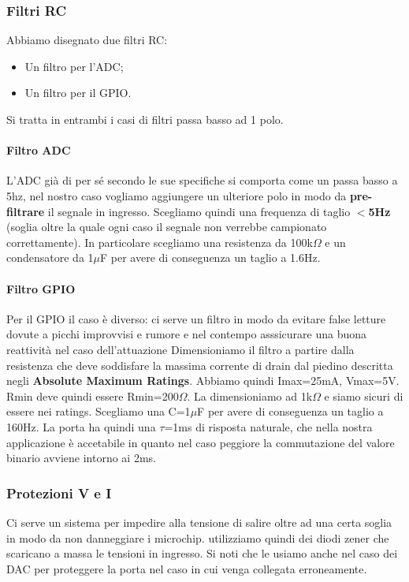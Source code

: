 \documentclass[10pt]{article}
\begin{document}
		\subsubsection{Filtri RC}
		Abbiamo disegnato due filtri RC:
		\begin{itemize}
		        \item Un filtro per l'ADC;
		        \item Un filtro per il GPIO.
		\end{itemize}
		
		Si tratta in entrambi i casi di filtri passa basso ad 1 polo.
		
			\paragraph{Filtro ADC}
				L'ADC già di per sé secondo le sue specifiche si comporta come un passa basso a 5hz, nel nostro caso vogliamo aggiungere un ulteriore polo in modo da \textbf{pre-filtrare} il segnale in ingresso.
				Scegliamo quindi una frequenza di taglio \textbf{\(<\)5Hz} (soglia oltre la quale ogni caso il segnale non verrebbe campionato correttamente).
				In particolare scegliamo una resistenza da 100k\(\Omega\) e un condensatore da 1\(\mu\)F per avere di conseguenza un taglio a 1.6Hz.
			\paragraph{Filtro GPIO}
				Per il GPIO il caso è diverso: ci serve un filtro in modo da evitare false letture dovute a picchi improvvisi e rumore e nel contempo asssicurare una buona reattività nel caso dell'attuazione
				Dimensioniamo il filtro a partire dalla resistenza che deve soddisfare la massima corrente di drain dal piedino descritta negli \textbf{Absolute Maximum Ratings}.
				Abbiamo quindi Imax=25mA, Vmax=5V. Rmin deve quindi essere Rmin=200\(\Omega\). La dimensioniamo ad 1k\(\Omega\) e siamo sicuri di essere nei ratings.
				Scegliamo una C=1\(\mu\)F per avere di conseguenza un taglio a 160Hz. La porta ha quindi una \(\tau\)=1ms di risposta naturale, che nella nostra applicazione è accetabile in quanto nel caso peggiore la commutazione del valore binario avviene intorno ai 2ms.
		\subsubsection{Protezioni V e I}
		Ci serve un sistema per impedire alla tensione di salire oltre ad una certa soglia in modo da non danneggiare i microchip. utilizziamo quindi dei diodi zener che scaricano a massa le tensioni in ingresso.
		Si noti che le usiamo anche nel caso dei DAC per proteggere la porta nel caso in cui venga collegata erroneamente.
\end{document}
